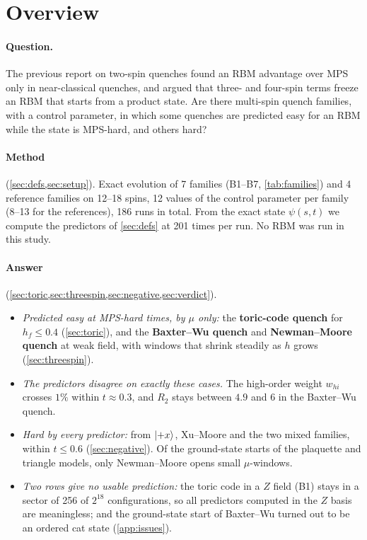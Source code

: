 \documentclass[11pt,a4paper]{article}
\newcommand{\BW}{\textcolor{cBW}{\textbf{Baxter--Wu quench}}}
\newcommand{\NM}{\textcolor{cNM}{\textbf{Newman--Moore quench}}}
\newcommand{\TC}{\textcolor{cTC}{\textbf{toric-code quench}}}
\newcommand{\whi}{w_{hi}}
\begin{document}
\section{Overview}
\paragraph{Question.} The previous report on two-spin quenches found an RBM advantage over MPS only in near-classical
quenches, and argued that three- and four-spin terms freeze an RBM that starts from a product state. Are there
multi-spin quench families, with a control parameter, in which some quenches are predicted easy for an RBM while the
state is MPS-hard, and others hard?

\paragraph{Method} (\cref{sec:defs,sec:setup}). Exact evolution of 7 families (B1--B7, \cref{tab:families}) and 4
reference families on 12--18 spins, 12 values of the control parameter per family (8--13 for the references), 186 runs
in total. From the exact state $\psi(s,t)$ we compute the predictors of \cref{sec:defs} at 201 times per run. No RBM
was run in this study.

\paragraph{Answer} (\cref{sec:toric,sec:threespin,sec:negative,sec:verdict}).
\begin{itemize}
  \item \emph{Predicted easy at MPS-hard times, by $\mu$ only:} the \TC{} for $h_f\le0.4$ (\cref{sec:toric}), and the
    \BW{} and \NM{} at weak field, with windows that shrink steadily as $h$ grows (\cref{sec:threespin}).
  \item \emph{The predictors disagree on exactly these cases.} The high-order weight $\whi$ crosses $1\%$ within
    $t\approx0.3$, and $R_2$ stays between $4.9$ and $6$ in the Baxter--Wu quench.
  \item \emph{Hard by every predictor:} from $\ket{+x}$, Xu--Moore and the two mixed families, within $t\le0.6$
    (\cref{sec:negative}). Of the ground-state starts of the plaquette and triangle models, only Newman--Moore opens
    small $\mu$-windows.
  \item \emph{Two rows give no usable prediction:} the toric code in a $Z$ field (B1) stays in a sector of 256 of
    $2^{18}$ configurations, so all predictors computed in the $Z$ basis are meaningless; and the ground-state start
    of Baxter--Wu turned out to be an ordered cat state (\cref{app:issues}).
\end{itemize}
\end{document}
